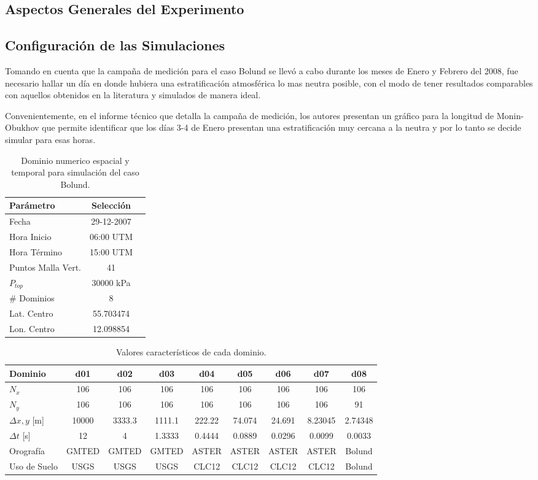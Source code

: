 \subsection{Aspectos Generales del Experimento}
\subsection{Configuración de las Simulaciones}
Tomando en cuenta que la campaña de medición para el caso Bolund se llevó a cabo durante los meses de Enero y Febrero del 2008, fue necesario hallar un día en donde hubiera una estratificación atmosférica lo mas neutra posible, con el modo de tener resultados comparables con aquellos obtenidos en la literatura y simulados de manera ideal.

Convenientemente, en el informe técnico que detalla la campaña de medición, los autores presentan un gráfico para la longitud de Monin-Obukhov que permite identificar que los días 3-4 de Enero presentan una estratificación muy cercana a la neutra y por lo tanto se decide simular para esas horas.
\begin{table}[h!]
	\caption{Dominio numerico espacial y temporal para simulación del caso Bolund.}\label{tab:05_config_bol}
	\centering\footnotesize
	\begin{tabular}{lcc}
		\toprule
		Parámetro & Selección \\
		\midrule
		Fecha	 	 & 29-12-2007   \\
		Hora Inicio	 	 & 06:00 UTM\\
		Hora Término	 		 & 15:00 UTM\\
		Puntos Malla Vert.	 	 & 41   \\
		$P_{top}$ 	& 30000 kPa\\
		\# Dominios	& 8   \\
		Lat. Centro	& 55.703474   \\
		Lon. Centro	& 12.098854   \\
		\bottomrule
	\end{tabular}
\end{table}

\begin{table}[H]
	\caption{Valores característicos de cada dominio.}\label{tab:05_caract_bol}
	\centering\footnotesize
	\begin{tabular}{lcccccccc}
		\toprule
		Dominio 				& d01	&	d02	&	d03	&	d04	&	d05	&	d06 &	d07&	d08 \\
		\midrule
		$N_x$		& 106 & 106 & 106 &106&106&106&106&106  \\
		$N_y$	 		& 106 & 106 & 106 &106&106&106&106&91  \\
		$\Delta x, y$	[m]	 		& 10000 & 3333.3 & 1111.1 &222.22&74.074&24.691&8.23045&2.74348  \\
		$\Delta t$	[s]	 		& 12 & 4 & 1.3333 &0.4444&0.0889&0.0296&0.0099&0.0033  \\
		Orografía		 	& GMTED & GMTED & GMTED &ASTER&ASTER&ASTER&ASTER&Bolund  \\
		Uso de Suelo		& USGS & USGS & USGS &CLC12&CLC12&CLC12&CLC12&Bolund \\
		\bottomrule
	\end{tabular}
\end{table}

